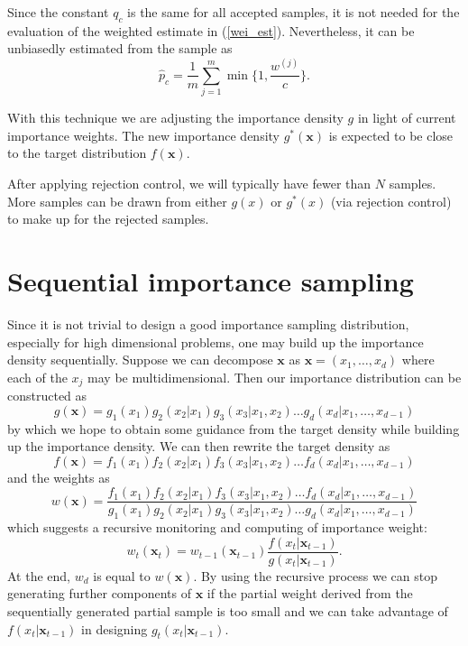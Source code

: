 \documentclass[times, utf8, diplomski]{fer}
\begin{document}
Since the constant $q_c$ is the same for all accepted samples, it is not needed for the  evaluation of the weighted estimate in (\ref{wei_est}). Nevertheless, it can be unbiasedly estimated \cite{Liu} from the sample as 
\begin{equation}
\hat{p}_{c} = \frac{1}{m} \sum_{j = 1}^{m} \min  \Big \{ {1, \frac{w^{(j)}}{c}} \Big \}.
\end{equation}

With this technique we are adjusting the importance density $g$  in light of current importance weights. The new importance density $g^{*}(\mathbf{x})$ is expected to be close to the target distribution $f(\mathbf{x})$.

After applying rejection control, we will typically have fewer than $N$ samples. More samples can be drawn from either $g(x)$ or $g^{*}(x)$ (via rejection control) to make up for the rejected samples. 

\section{Sequential importance sampling}
Since it is not trivial to design a good importance sampling distribution, especially for high dimensional problems, one may build up the importance density sequentially. Suppose we can decompose $\mathbf{x}$ as $\mathbf{x} = (x_1, \ldots, x_d)$ where each of the $x_j$ may be multidimensional. Then our importance distribution can be constructed as 
\begin{equation}
g(\mathbf{x}) = g_1(x_1) g_2(x_2 | x_1) g_3(x_3 | x_1, x_2) \ldots g_d(x_d | x_1, \ldots, x_{d - 1})
\end{equation}
by which we hope to obtain some guidance from the target density while building up the  importance density. We can then rewrite the target density as 
\begin{equation}
f(\mathbf{x}) = f_1(x_1) f_2(x_2 | x_1) f_3(x_3 | x_1, x_2) \ldots f_d(x_d | x_1, \ldots, x_{d - 1})
\end{equation}
and the weights as 
\begin{equation}
w(\mathbf{x}) = \frac{f_1(x_1) f_2(x_2 | x_1) f_3(x_3 | x_1, x_2) \ldots f_d(x_d | x_1, \ldots, x_{d - 1})}{g_1(x_1) g_2(x_2 | x_1) g_3(x_3 | x_1, x_2) \ldots g_d(x_d | x_1, \ldots, x_{d - 1})}
\end{equation}
which suggests a recursive monitoring and computing of importance weight:
\begin{equation}
w_t(\mathbf{x}_t) = w_{t - 1}(\mathbf{x}_{t - 1})\frac{f(x_t | \mathbf{x}_{t - 1})}{g(x_t | \mathbf{x}_{t - 1})}.    
\end{equation}
At the end, $w_d$ is equal to $w(\mathbf{x})$. By using the recursive process we can stop generating further components of $\mathbf{x}$ if the partial weight derived from the sequentially generated partial sample is too small and we can take advantage of $f(x_t | \mathbf{x}_{t - 1})$ in designing $g_t(x_t | \mathbf{x}_{t - 1})$.
\end{document}
